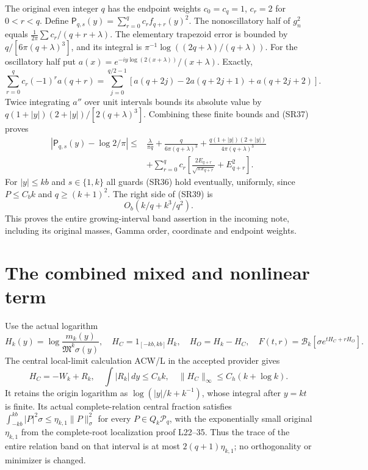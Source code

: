 \documentclass[11pt]{article}
\newcommand{\PP}{\mathcal P}\newcommand{\BB}{\mathcal B}
\newcommand{\dd}{\,d}\newcommand{\Tr}{\operatorname{Tr}}
\begin{document}
The original even integer $q$ has the endpoint weights
$c_0=c_q=1$, $c_r=2$ for $0<r<q$. Define
$\mathsf P_{q,s}(y)=\sum_{r=0}^qc_rf_{q+r}(y)^2$.
The nonoscillatory half of $g_n^2$ equals
$\frac1{2\pi}\sum c_r/(q+r+\lambda)$.
The elementary trapezoid error is bounded by
$q/[6\pi(q+\lambda)^3]$, and its integral is
$\pi^{-1}\log((2q+\lambda)/(q+\lambda))$.
For the oscillatory half put
$a(x)=e^{-iy\log(2(x+\lambda))}/(x+\lambda)$.
Exactly,
\begin{equation}\tag{SR38}
 \sum_{r=0}^qc_r(-1)^ra(q+r)
 =\sum_{j=0}^{q/2-1}
 [a(q+2j)-2a(q+2j+1)+a(q+2j+2)].
\end{equation}
Twice integrating $a''$ over unit intervals bounds its absolute value by
$q(1+|y|)(2+|y|)/[2(q+\lambda)^3]$.
Combining these finite bounds and (SR37) proves
\begin{equation}\tag{SR39}\begin{aligned}
 |\mathsf P_{q,s}(y)-\log2/\pi|
 \le{}&\frac{\lambda}{\pi q}+
 \frac{q}{6\pi(q+\lambda)^3}
 +\frac{q(1+|y|)(2+|y|)}{4\pi(q+\lambda)^3}\\
 &+\sum_{r=0}^qc_r\left[
 \frac{2E_{q+r}}{\sqrt{\pi x_{q+r}}}+E_{q+r}^2\right].
\end{aligned}\end{equation}
For $|y|\le kb$ and $s\in\{1,k\}$ all guards (SR36) hold eventually,
uniformly, since $P\le C_bk$ and $q\ge(k+1)^2$. The right side of (SR39) is
\begin{equation}\tag{SR40}
 O_b(k/q+k^3/q^2).
\end{equation}
This proves the entire growing-interval band assertion in the incoming note,
including its original masses, Gamma order, coordinate and endpoint weights.

\section{The combined mixed and nonlinear term}
Use the actual logarithm
\[
 H_k(y)=\log\frac{m_k(y)}{\mathfrak M^k\sigma(y)},\quad
 H_C=1_{[-kb,kb]}H_k,\quad H_O=H_k-H_C,
 \quad F(t,r)=\BB_k[\sigma e^{tH_C+rH_O}].
\]
The central local-limit calculation ACW/L in the accepted provider gives
\begin{equation}\tag{SR41}
 H_C=-W_k+R_k,\quad \int|R_k|\dd y\le C_hk,\quad
 \|H_C\|_\infty\le C_h(k+\log k).
\end{equation}
It retains the origin logarithm as $\log(|y|/k+k^{-1})$, whose integral after
$y=kt$ is finite. Its actual complete-relation central fraction satisfies
$\int_{-kb}^{kb}|P|^2\sigma\le\eta_{k,1}\|P\|_\sigma^2$
for every $P\in Q_k\PP_q$, with the exponentially small original
$\eta_{k,1}$ from the complete-root localization proof L22--35.
Thus the trace of the entire relation band on that interval is at most
$2(q+1)\eta_{k,1}$; no orthogonality or minimizer is changed.
\end{document}
